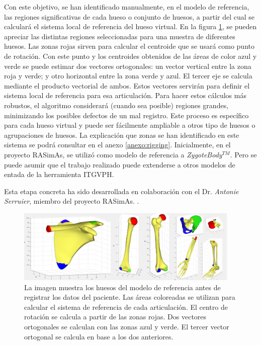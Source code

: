 Con este objetivo, se han identificado manualmente, en el modelo de referencia, las regiones significativas de cada hueso o conjunto de huesos, a partir del cual se calculará el sistema local de referencia del hueso virtual. En la figura \ref{fig:humero}, se pueden apreciar las distintas regiones seleccionadas para una muestra de diferentes huesos. Las zonas rojas sirven para calcular el centroide que se usará como punto de rotación. Con este punto y los centroides obtenidos de las áreas de color azul y verde se puede estimar dos vectores ortogonales: un vector vertical entre la zona roja y verde; y otro horizontal entre la zona verde y azul. El tercer eje se calcula mediante el producto vectorial de ambos. Estos vectores servirán para definir el sistema local de referencia para esa articulación. Para hacer estos cálculos más robustos, el algoritmo considerará (cuando sea posible) regiones grandes, minimizando los posibles defectos de un mal registro. Este proceso es específico para cada hueso virtual y puede ser fácilmente ampliable a otros tipo de huesos o agrupaciones de huesos. La explicación  que zonas se han identificado en este sistema se podrá consultar en el anexo \ref{anexo:rigging}. 
%
Inicialmente, en el proyecto \ac{RASimAs}, se utilizó como modelo de referencia a  \emph{ZygoteBody}$^{TM}$. Pero se puede asumir que el trabajo realizado puede extenderse a otros modelos de entada de la herramienta \ac{ITGVPH}. 


Esta etapa concreta ha sido desarrollada en colaboración con el Dr. \emph{Antonie Serruier}, miembro del proyecto \ac{RASimAs}. . 

\begin{figure}
   \centering
    \includegraphics[width=0.95\textwidth]{IMG/rigshoulder.png}%
    \caption{La imagen muestra los huesos del modelo de referencia antes de registrar los datos del paciente. Las áreas coloreadas se utilizan para calcular el sistema de referencia de cada articulación. El centro de rotación se calcula a partir de las zonas rojas. Dos vectores ortogonales se calculan con las zonas azul y verde. El tercer vector ortogonal se calcula en base a los dos anteriores.}
\label{fig:humero}
\end{figure}


